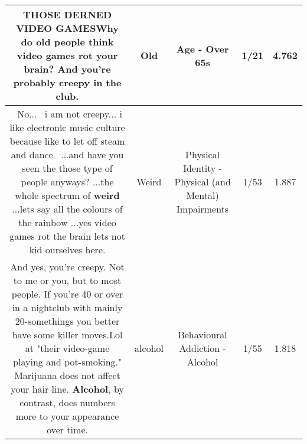 \documentclass[11pt]{article}
\newlength\mylength
\begin{document}
\begin{center}
\begin{longtable}{|C{.65\mylength}|C{.30\mylength}|C{.12\mylength}|C{.12\mylength}|C{.12\mylength}|}
  \small THOSE DERNED VIDEO GAMESWhy do \textbf{old} people think video games rot your brain? And you're probably creepy in the club.\normalsize   & Old & Age - Over 65s & 1/21 & 4.762 \\  \hline
  \small {} No...  i am not creepy... i like electronic music culture because like to let off steam and dance  ...and have you seen the those type of people anyways? ...the whole spectrum of \textbf{weird} ...lets say all the colours of the rainbow ...yes video games rot the brain lets not kid ourselves here.\normalsize   & Weird & Physical Identity - Physical (and Mental) Impairments & 1/53 & 1.887 \\  \hline
  \small And yes, you're creepy. Not to me or you, but to most people. If you're 40 or over in a nightclub with mainly 20-somethings you better have some killer moves.Lol at "their video-game playing and pot-smoking." Marijuana does not affect your hair line. \textbf{Alcohol}, by contrast, does numbers more to your appearance over time.\normalsize   & alcohol & Behavioural Addiction - Alcohol & 1/55 & 1.818 \\  \hline

\end{longtable}
\end{center}
\end{document}
